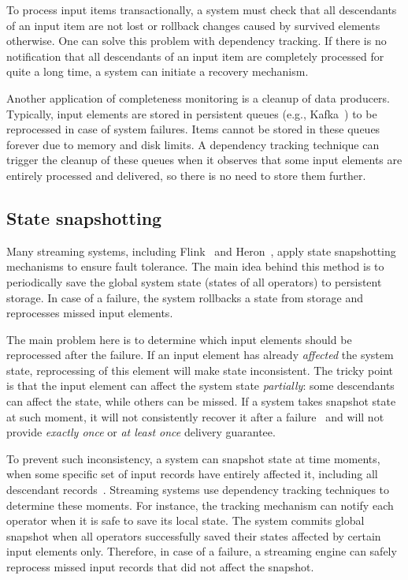 To process input items transactionally, a system must check that all descendants of an input item are not lost or rollback changes caused by survived elements otherwise. One can solve this problem with dependency tracking. If there is no notification that all descendants of an input item are completely processed for quite a long time, a system can initiate a recovery mechanism.

Another application of completeness monitoring is a cleanup of data producers. Typically, input elements are stored in persistent queues (e.g., Kafka~\cite{kreps2011kafka}) to be reprocessed in case of system failures. Items cannot be stored in these queues forever due to memory and disk limits. A dependency tracking technique can trigger the cleanup of these queues when it observes that some input elements are entirely processed and delivered, so there is no need to store them further.

\subsection{State snapshotting}
Many streaming systems, including Flink~\cite{Carbone:2017:SMA:3137765.3137777} and Heron~\cite{Kulkarni:2015:THS:2723372.2742788}, apply state snapshotting mechanisms to ensure fault tolerance. The main idea behind this method is to periodically save the global system state (states of all operators) to persistent storage. In case of a failure, the system rollbacks a state from storage and reprocesses missed input elements. 

The main problem here is to determine which input elements should be reprocessed after the failure. If an input element has already {\em affected} the system state, reprocessing of this element will make state inconsistent. The tricky point is that the input element can affect the system state {\em partially}: some descendants can affect the state, while others can be missed. If a system takes snapshot state at such moment, it will not consistently recover it after a failure~\cite{2015arXiv150608603C} and will not provide {\em exactly once} or {\em at least once} delivery guarantee.

To prevent such inconsistency, a system can snapshot state at time moments, when some specific set of input records have entirely affected it, including all descendant records~\cite{2015arXiv150608603C, thepaper}. Streaming systems use dependency tracking techniques to determine these moments. For instance, the tracking mechanism can notify each operator when it is safe to save its local state. The system commits global snapshot when all operators successfully saved their states affected by certain input elements only. Therefore, in case of a failure, a streaming engine can safely reprocess missed input records that did not affect the snapshot.

